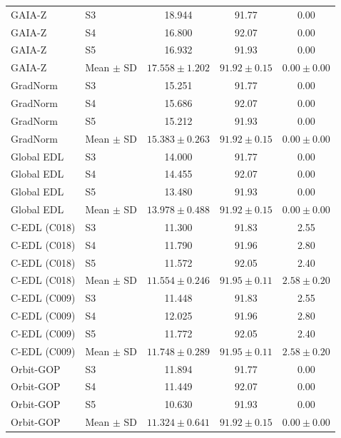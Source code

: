\begin{longtable}{@{}llccc@{}}
GAIA-Z & S3 & 18.944 & 91.77 & 0.00 \\
GAIA-Z & S4 & 16.800 & 92.07 & 0.00 \\
GAIA-Z & S5 & 16.932 & 91.93 & 0.00 \\
GAIA-Z & Mean $\pm$ SD & $17.558 \pm 1.202$ & $91.92 \pm 0.15$ & $0.00 \pm 0.00$ \\
GradNorm & S3 & 15.251 & 91.77 & 0.00 \\
GradNorm & S4 & 15.686 & 92.07 & 0.00 \\
GradNorm & S5 & 15.212 & 91.93 & 0.00 \\
GradNorm & Mean $\pm$ SD & $15.383 \pm 0.263$ & $91.92 \pm 0.15$ & $0.00 \pm 0.00$ \\
Global EDL & S3 & 14.000 & 91.77 & 0.00 \\
Global EDL & S4 & 14.455 & 92.07 & 0.00 \\
Global EDL & S5 & 13.480 & 91.93 & 0.00 \\
Global EDL & Mean $\pm$ SD & $13.978 \pm 0.488$ & $91.92 \pm 0.15$ & $0.00 \pm 0.00$ \\
C-EDL (C018) & S3 & 11.300 & 91.83 & 2.55 \\
C-EDL (C018) & S4 & 11.790 & 91.96 & 2.80 \\
C-EDL (C018) & S5 & 11.572 & 92.05 & 2.40 \\
C-EDL (C018) & Mean $\pm$ SD & $11.554 \pm 0.246$ & $91.95 \pm 0.11$ & $2.58 \pm 0.20$ \\
C-EDL (C009) & S3 & 11.448 & 91.83 & 2.55 \\
C-EDL (C009) & S4 & 12.025 & 91.96 & 2.80 \\
C-EDL (C009) & S5 & 11.772 & 92.05 & 2.40 \\
C-EDL (C009) & Mean $\pm$ SD & $11.748 \pm 0.289$ & $91.95 \pm 0.11$ & $2.58 \pm 0.20$ \\
Orbit-GOP & S3 & 11.894 & 91.77 & 0.00 \\
Orbit-GOP & S4 & 11.449 & 92.07 & 0.00 \\
Orbit-GOP & S5 & 10.630 & 91.93 & 0.00 \\
Orbit-GOP & Mean $\pm$ SD & $11.324 \pm 0.641$ & $91.92 \pm 0.15$ & $0.00 \pm 0.00$ \\
\end{longtable}
\endgroup

\clearpage
